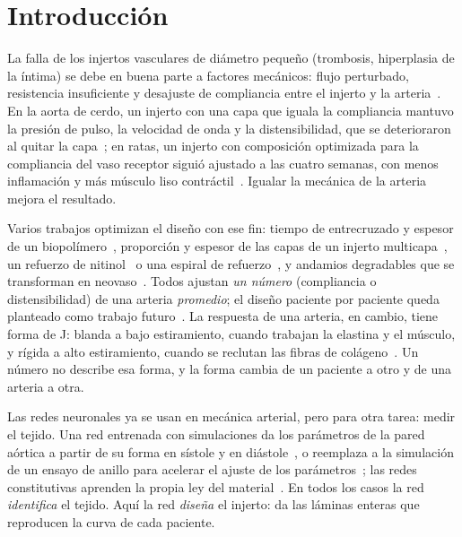 \section{Introducción}
La falla de los injertos vasculares de diámetro pequeño (trombosis, hiperplasia de la íntima) se debe en buena parte a factores mecánicos: flujo perturbado, resistencia insuficiente y desajuste de compliancia entre el injerto y la arteria~\cite{ding}. En la aorta de cerdo, un injerto con una capa que iguala la compliancia mantuvo la presión de pulso, la velocidad de onda y la distensibilidad, que se deterioraron al quitar la capa~\cite{rovas25}; en ratas, un injerto con composición optimizada para la compliancia del vaso receptor siguió ajustado a las cuatro semanas, con menos inflamación y más músculo liso contráctil~\cite{furdella}. Igualar la mecánica de la arteria mejora el resultado.

Varios trabajos optimizan el diseño con ese fin: tiempo de entrecruzado y espesor de un biopolímero~\cite{harrison}, proporción y espesor de las capas de un injerto multicapa~\cite{tamimi}, un refuerzo de nitinol~\cite{rovas23} o una espiral de refuerzo~\cite{jiang}, y andamios degradables que se transforman en neovaso~\cite{szafron,hsu}. Todos ajustan \emph{un número} (compliancia o distensibilidad) de una arteria \emph{promedio}; el diseño paciente por paciente queda planteado como trabajo futuro~\cite{harrison,rovas23}. La respuesta de una arteria, en cambio, tiene forma de J: blanda a bajo estiramiento, cuando trabajan la elastina y el músculo, y rígida a alto estiramiento, cuando se reclutan las fibras de colágeno~\cite{holzapfel,humphrey}. Un número no describe esa forma, y la forma cambia de un paciente a otro y de una arteria a otra.

Las redes neuronales ya se usan en mecánica arterial, pero para otra tarea: medir el tejido. Una red entrenada con simulaciones da los parámetros de la pared aórtica a partir de su forma en sístole y en diástole~\cite{liuml}, o reemplaza a la simulación de un ensayo de anillo para acelerar el ajuste de los parámetros~\cite{utrera}; las redes constitutivas aprenden la propia ley del material~\cite{linka,vervenne}. En todos los casos la red \emph{identifica} el tejido. Aquí la red \emph{diseña} el injerto: da las láminas enteras que reproducen la curva de cada paciente.

